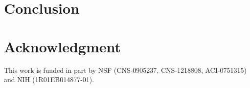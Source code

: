 \documentclass[conference,compsoc]{IEEEtran}
\begin{document}
\vspace{-0.1in}
\section{Conclusion}
\vspace{-0.1in}


\vspace{-0.1in}
\section*{Acknowledgment}
\vspace{-0.1in}
This work is funded in part by NSF (CNS-0905237, CNS-1218808, ACI-0751315) and NIH
(1R01EB014877-01).

\vspace{-0.1in}

%

\end{document}

